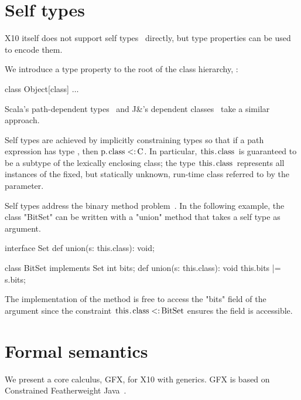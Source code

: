 \documentclass[preprint,nocopyrightspace,9pt]{sigplanconf}
\newcommand\gxx{GFX\xspace}
\begin{document}
\section{Self types}
\label{sec:self}

X10 itself does not support self 
types~\cite{bruce-binary,bsg95}
directly, but type properties can
be used to encode them.

%
We introduce a 
type property  to the root of the class hierarchy, :
\begin{xtenmath}
class Object[class] { $\dots$ }
\end{xtenmath}
Scala's path-dependent types~\cite{scala} and J\&'s
dependent classes~\cite{nqm06}
take a similar approach.

\noindent
Self types are achieved by
implicitly constraining types so that if a path expression 
has type , then
$\Xcd{p}.\Xcd{class} \subtype \Xcd{C}$.  In particular,
$\Xcd{this}.\Xcd{class}$ is guaranteed to be a subtype
of the lexically enclosing class; the type
$\Xcd{this}.\Xcd{class}$ represents all instances of the fixed,
but statically unknown, run-time class referred to by the 
parameter.

Self types address the binary method problem~\cite{bruce-binary}.
In the following
example, the class \xcd"BitSet" can be written with a
\xcd"union" method that takes a self type as argument.

\begin{xtenmath}
interface Set {
    def union(s: this.class): void;
}

class BitSet implements Set {
    int bits;
    def union(s: this.class): void {
        this.bits |= s.bits;
    }
}
\end{xtenmath}

\noindent
The implementation of the method is free to access the
\xcd"bits" field of the argument since the constraint
$\Xcd{this}.\Xcd{class} \subtype \Xcd{BitSet}$ ensures the field is
accessible.



\section{Formal semantics}
\label{sec:semantics}

We present a core calculus, \gxx, for X10 with generics.
\gxx is based on Constrained Featherweight
Java~\cite{constrained-types}.

\end{document}
